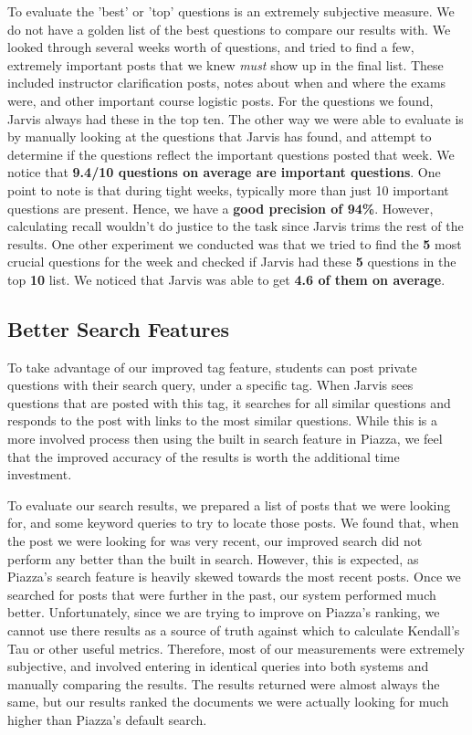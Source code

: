 \documentclass[sigconf]{acmart}
\begin{document}
To evaluate the 'best' or 'top' questions is an extremely subjective measure. We do not have a golden list of the best questions to compare our results with. We looked through several weeks worth of questions, and tried to find a few, extremely important posts that we knew \textit{must} show up in the final list. These included instructor clarification posts, notes about when and where the exams were, and other important course logistic posts. For the questions we found, Jarvis always had these in the top ten. The other way we were able to evaluate is by manually looking at the questions that Jarvis has found, and attempt to determine if the questions reflect the important questions posted that week. We notice that \textbf{9.4/10 questions on average are important questions}. One point to note is that during tight weeks, typically more than just 10 important questions are present. Hence, we have a \textbf{good precision of 94\%}. However, calculating recall wouldn't do justice to the task since Jarvis trims the rest of the results. One other experiment we conducted was that we tried to find the \textbf{5} most crucial questions for the week and checked if Jarvis had these \textbf{5} questions in the top \textbf{10} list. We noticed that Jarvis was able to get \textbf{4.6 of them on average}.

\subsection{Better Search Features}
To take advantage of our improved tag feature, students can post private questions with their search query, under a specific tag. When Jarvis sees questions that are posted with this tag, it searches for all similar questions and responds to the post with links to the most similar questions. While this is a more involved process then using the built in search feature in Piazza, we feel that the improved accuracy of the results is worth the additional time investment.

To evaluate our search results, we prepared a list of posts that we were looking for, and some keyword queries to try to locate those posts. We found that, when the post we were looking for was very recent, our improved search did not perform any better than the built in search. However, this is expected, as Piazza's search feature is heavily skewed towards the most recent posts. Once we searched for posts that were further in the past, our system performed much better. Unfortunately, since we are trying to improve on Piazza's ranking, we cannot use there results as a source of truth against which to calculate Kendall's Tau or other useful metrics. Therefore, most of our measurements were extremely subjective, and involved entering in identical queries into both systems and manually comparing the results. The results returned were almost always the same, but our results ranked the documents we were actually looking for much higher than Piazza's default search.
\end{document}
